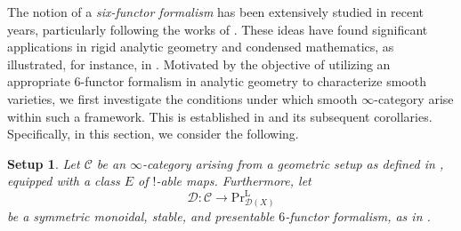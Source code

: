\documentclass[oneside, hidelinks, 12pt, a4paper,reqno]{amsart}
\theoremstyle{plain}
\theoremstyle{definition}
\theoremstyle{plain}
\newtheorem{setup}[setup]{Setup}
\newcommand{\rL}{\mathrm L}
\newcommand{\cC}{\mathscr C}
\newcommand{\cD}{\mathscr D}
\newcommand{\cat}{$\infty$-category }
\newcommand{\LPr}{\mathrm{Pr}^\rL}
\begin{document}
The notion of a \emph{six-functor formalism} has been extensively studied in recent years, particularly following the works of \cite{heyer20246functorformalismssmoothrepresentations,scholze2025sixfunctorformalisms, liu2024enhancedoperationsbasechange, zavyalov2023poincaredualityabstract6functor, kesting2025categoricalkunnethformulasanalytic}. These ideas have found significant applications in rigid analytic geometry and condensed mathematics, as illustrated, for instance, in \cite{mann2022padic6functorformalismrigidanalytic, camargo2024analyticrhamstackrigid, soor2025sixfunctorformalismquasicoherentsheaves}. Motivated by the objective of utilizing an appropriate $6$-functor formalism in analytic geometry to characterize smooth varieties, we first investigate the conditions under which smooth \cat arise within such a framework. This is established in  and its subsequent corollaries. Specifically, in this section, we consider the following. 

\begin{setup}\label{assumptions 6 functor}
Let $\cC$ be an \cat arising from a geometric setup as defined in \cite[Definition 2.1.1]{heyer20246functorformalismssmoothrepresentations}, equipped with a class $E$ of $!$-able maps. Furthermore, let
\[
\cD \colon \cC \to \LPr_{\cD(X)}
\]
be a symmetric monoidal, stable, and presentable $6$-functor formalism, as in \cite[Definition 3.2.1]{heyer20246functorformalismssmoothrepresentations}.
\end{setup}
\end{document}
